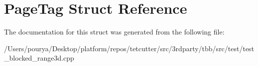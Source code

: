 \hypertarget{structPageTag}{}\section{Page\+Tag Struct Reference}
\label{structPageTag}


The documentation for this struct was generated from the following file\+:\begin{DoxyCompactItemize}
\item 
/\+Users/pourya/\+Desktop/platform/repos/tetcutter/src/3rdparty/tbb/src/test/test\+\_\+blocked\+\_\+range3d.\+cpp\end{DoxyCompactItemize}
